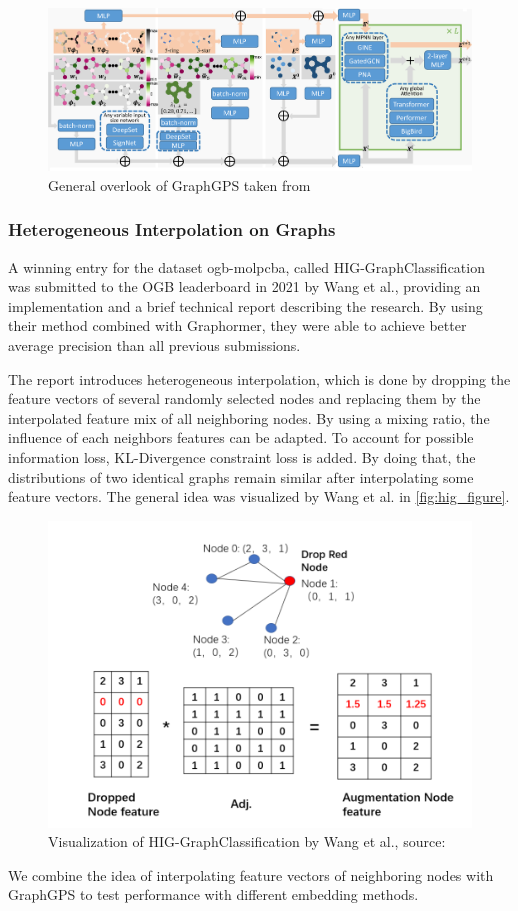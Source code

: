 \begin{figure}[ht!]
    \centering
    \includegraphics[scale=0.13]{tex/res/gps_abstract.png}
    \caption{General overlook of GraphGPS taken from~\cite{2023graphgps}}
    \label{fig:gps-abstract}
\end{figure}

\subsubsection{Heterogeneous Interpolation on Graphs}
A winning entry for the dataset ogb-molpcba, called HIG-GraphClassification~\cite{tencenc2021Hig,tencenc2021HigPaper} was submitted to the OGB leaderboard in 2021 by Wang et al., providing an implementation and a brief technical report describing the research. By using their method combined with Graphormer, they were able to achieve better average precision than all previous submissions.

The report introduces heterogeneous interpolation, which is done by dropping the feature vectors of several randomly selected nodes and replacing them by the interpolated feature mix of all neighboring nodes.
By using a mixing ratio, the influence of each neighbors features can be adapted. To account for possible information loss, KL-Divergence constraint loss is added. By doing that, the distributions of two identical graphs remain similar after interpolating some feature vectors. The general idea was visualized by Wang et al. in \autoref{fig:hig_figure}.

\begin{figure}[ht!]
    \centering
    \includegraphics[scale=0.3]{tex/res/hig_figure.png}
    \caption{Visualization of HIG-GraphClassification by Wang et al., \tiny{source: \cite{tencenc2021HigPaper}}}
    \label{fig:hig_figure}
\end{figure}

We combine the idea of interpolating feature vectors of neighboring nodes with GraphGPS to test performance with different embedding methods.
